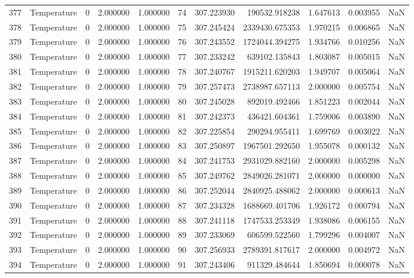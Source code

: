 \begin{tabular}{llrrrrrrrrr}
377 & Temperature & 0 & 2.000000 & 1.000000 & 74 & 307.223930 & 190532.918238 & 1.647613 & 0.003955 & NaN \\
378 & Temperature & 0 & 2.000000 & 1.000000 & 75 & 307.245424 & 2339430.675353 & 1.970215 & 0.006865 & NaN \\
379 & Temperature & 0 & 2.000000 & 1.000000 & 76 & 307.243552 & 1724044.394275 & 1.934766 & 0.010256 & NaN \\
380 & Temperature & 0 & 2.000000 & 1.000000 & 77 & 307.233242 & 639102.135843 & 1.803087 & 0.005015 & NaN \\
381 & Temperature & 0 & 2.000000 & 1.000000 & 78 & 307.240767 & 1915211.620203 & 1.949707 & 0.005064 & NaN \\
382 & Temperature & 0 & 2.000000 & 1.000000 & 79 & 307.257473 & 2738987.657113 & 2.000000 & 0.005754 & NaN \\
383 & Temperature & 0 & 2.000000 & 1.000000 & 80 & 307.245028 & 892019.492466 & 1.851223 & 0.002044 & NaN \\
384 & Temperature & 0 & 2.000000 & 1.000000 & 81 & 307.242373 & 436421.604361 & 1.759006 & 0.003890 & NaN \\
385 & Temperature & 0 & 2.000000 & 1.000000 & 82 & 307.225854 & 290294.955411 & 1.699769 & 0.003022 & NaN \\
386 & Temperature & 0 & 2.000000 & 1.000000 & 83 & 307.250897 & 1967501.292650 & 1.955078 & 0.000132 & NaN \\
387 & Temperature & 0 & 2.000000 & 1.000000 & 84 & 307.241753 & 2931029.882160 & 2.000000 & 0.005298 & NaN \\
388 & Temperature & 0 & 2.000000 & 1.000000 & 85 & 307.249762 & 2849026.281071 & 2.000000 & 0.000000 & NaN \\
389 & Temperature & 0 & 2.000000 & 1.000000 & 86 & 307.252044 & 2840925.488062 & 2.000000 & 0.000613 & NaN \\
390 & Temperature & 0 & 2.000000 & 1.000000 & 87 & 307.234328 & 1688669.401706 & 1.926172 & 0.000794 & NaN \\
391 & Temperature & 0 & 2.000000 & 1.000000 & 88 & 307.241118 & 1747533.253349 & 1.938086 & 0.006155 & NaN \\
392 & Temperature & 0 & 2.000000 & 1.000000 & 89 & 307.233069 & 606599.522560 & 1.799296 & 0.004007 & NaN \\
393 & Temperature & 0 & 2.000000 & 1.000000 & 90 & 307.256933 & 2789391.817617 & 2.000000 & 0.004972 & NaN \\
394 & Temperature & 0 & 2.000000 & 1.000000 & 91 & 307.243406 & 911329.484644 & 1.850694 & 0.000078 & NaN \\

\end{tabular}
